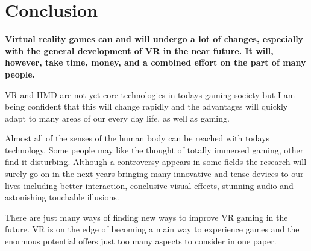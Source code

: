 \section{Conclusion}
\textbf{Virtual reality games can and will undergo a lot of changes, especially with the general development of VR in the near future. It will, however, take time, money, and a combined effort on the part of many people.}

VR and HMD are not yet core technologies in todays gaming society but I am being confident that this will change rapidly and the advantages will quickly adapt to many areas of our every day life, as well as gaming.

Almost all of the senses of the human body can be reached with todays technology. Some people may like the thought of totally immersed gaming, other find it disturbing.\newline
Although a controversy appears in some fields the research will surely go on in the next years bringing many innovative and tense devices to our lives including better interaction, conclusive visual effects, stunning audio and astonishing touchable illusions. 

There are just many ways of finding new ways to improve VR gaming in the future. VR is on the edge of becoming a main way to experience games and the enormous potential offers just too many aspects to consider in one paper.
